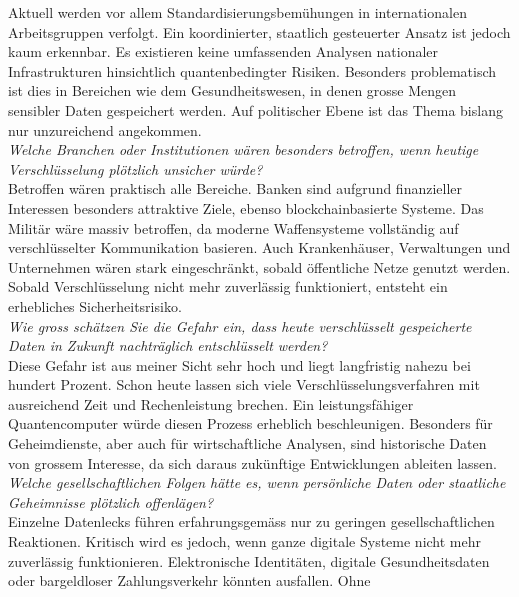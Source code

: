 Aktuell werden vor allem Standardisierungsbemühungen in internationalen Arbeitsgruppen verfolgt. 
Ein koordinierter, staatlich gesteuerter Ansatz ist jedoch kaum erkennbar. Es existieren keine 
umfassenden Analysen nationaler Infrastrukturen hinsichtlich quantenbedingter Risiken. Besonders 
problematisch ist dies in Bereichen wie dem Gesundheitswesen, in denen grosse Mengen sensibler Daten 
gespeichert werden. Auf politischer Ebene ist das Thema bislang nur unzureichend angekommen.
\vspace{1em}
\\
\hypertarget{dependency_cryptography}{}\textit{Welche Branchen oder Institutionen wären besonders betroffen, wenn heutige Verschlüsselung 
plötzlich unsicher würde?}\\
Betroffen wären praktisch alle Bereiche. Banken sind aufgrund finanzieller Interessen besonders 
attraktive Ziele, ebenso blockchainbasierte Systeme. Das Militär wäre massiv betroffen, da moderne 
Waffensysteme vollständig auf verschlüsselter Kommunikation basieren. Auch Krankenhäuser, 
Verwaltungen und Unternehmen wären stark eingeschränkt, sobald öffentliche Netze genutzt werden. 
Sobald Verschlüsselung nicht mehr zuverlässig funktioniert, entsteht ein erhebliches Sicherheitsrisiko.
\vspace{1em}
\\
\hypertarget{longterm_security}{}\textit{Wie gross schätzen Sie die Gefahr ein, dass heute verschlüsselt gespeicherte Daten in Zukunft 
nachträglich entschlüsselt werden?}\\
Diese Gefahr ist aus meiner Sicht sehr hoch und liegt langfristig nahezu bei hundert Prozent. Schon 
heute lassen sich viele Verschlüsselungsverfahren mit ausreichend Zeit und Rechenleistung brechen. 
Ein leistungsfähiger Quantencomputer würde diesen Prozess erheblich beschleunigen. Besonders für 
Geheimdienste, aber auch für wirtschaftliche Analysen, sind historische Daten von grossem Interesse, 
da sich daraus zukünftige Entwicklungen ableiten lassen.
\vspace{1em}
\\
\textit{Welche gesellschaftlichen Folgen hätte es, wenn persönliche Daten oder staatliche Geheimnisse 
plötzlich offenlägen?}\\
Einzelne Datenlecks führen erfahrungsgemäss nur zu geringen gesellschaftlichen Reaktionen. 
Kritisch wird es jedoch, wenn ganze digitale Systeme nicht mehr zuverlässig funktionieren. Elektronische 
Identitäten, digitale Gesundheitsdaten oder bargeldloser Zahlungsverkehr könnten ausfallen. Ohne 

